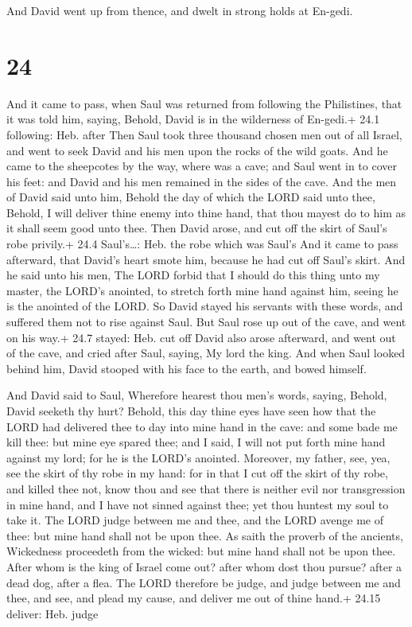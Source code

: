  And David went up from thence, and dwelt in strong holds
at En-gedi.

\hypertarget{section-23}{%
\section{24}\label{section-23}}

 And it came to pass, when Saul was returned from following
the Philistines, that it was told him, saying, Behold, David is in the
wilderness of En-gedi.+ 24.1 following: Heb. after  Then
Saul took three thousand chosen men out of all Israel, and went to seek
David and his men upon the rocks of the wild goats.  And he
came to the sheepcotes by the way, where was a cave; and Saul went in to
cover his feet: and David and his men remained in the sides of the cave.
 And the men of David said unto him, Behold the day of which
the LORD said unto thee, Behold, I will deliver thine enemy into thine
hand, that thou mayest do to him as it shall seem good unto thee. Then
David arose, and cut off the skirt of Saul's robe privily.+ 24.4
Saul's\ldots: Heb. the robe which was Saul's  And it came to
pass afterward, that David's heart smote him, because he had cut off
Saul's skirt.  And he said unto his men, The LORD forbid
that I should do this thing unto my master, the LORD's anointed, to
stretch forth mine hand against him, seeing he is the anointed of the
LORD.  So David stayed his servants with these words, and
suffered them not to rise against Saul. But Saul rose up out of the
cave, and went on his way.+ 24.7 stayed: Heb. cut off  David
also arose afterward, and went out of the cave, and cried after Saul,
saying, My lord the king. And when Saul looked behind him, David stooped
with his face to the earth, and bowed himself.

 And David said to Saul, Wherefore hearest thou men's
words, saying, Behold, David seeketh thy hurt?  Behold,
this day thine eyes have seen how that the LORD had delivered thee to
day into mine hand in the cave: and some bade me kill thee: but mine eye
spared thee; and I said, I will not put forth mine hand against my lord;
for he is the LORD's anointed.  Moreover, my father, see,
yea, see the skirt of thy robe in my hand: for in that I cut off the
skirt of thy robe, and killed thee not, know thou and see that there is
neither evil nor transgression in mine hand, and I have not sinned
against thee; yet thou huntest my soul to take it.  The
LORD judge between me and thee, and the LORD avenge me of thee: but mine
hand shall not be upon thee.  As saith the proverb of the
ancients, Wickedness proceedeth from the wicked: but mine hand shall not
be upon thee.  After whom is the king of Israel come out?
after whom dost thou pursue? after a dead dog, after a flea.
 The LORD therefore be judge, and judge between me and
thee, and see, and plead my cause, and deliver me out of thine hand.+
24.15 deliver: Heb. judge


